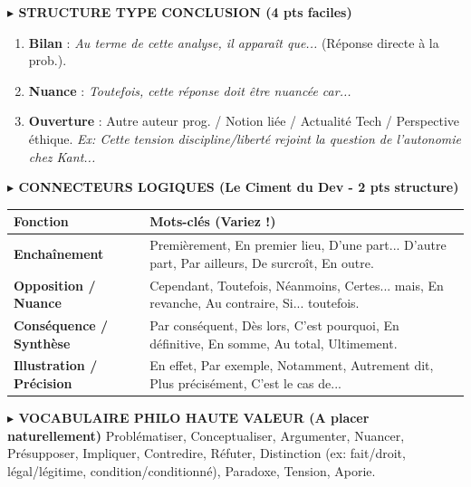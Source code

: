 \documentclass[11pt]{article}
\newcommand{\cle}[1]{{\popxbold\color{popdark}#1}}
\begin{document}
\begin{exemplebox}
\textbf{$\blacktriangleright$ STRUCTURE TYPE CONCLUSION (4 pts faciles)}
\begin{enumerate}
    \item \textbf{Bilan} : \textit{\og{}Au terme de cette analyse, il appara\^it que...\fg{}} (R\'eponse directe \`a la prob.).
    \item \textbf{Nuance} : \textit{\og{}Toutefois, cette r\'eponse doit \^etre nuanc\'ee car...\fg{}}
    \item \textbf{Ouverture} : Autre auteur prog. / Notion li\'ee / Actualit\'e Tech / Perspective \'ethique. \textit{Ex: \og{}Cette tension discipline/libert\'e rejoint la question de l'autonomie chez Kant...\fg{}}
\end{enumerate}
\end{exemplebox}

\begin{exemplebox}
\textbf{$\blacktriangleright$ CONNECTEURS LOGIQUES (Le \og{}Ciment\fg{} du Dev - 2 pts structure)}
\begin{center}
\begin{tabular}{|l|l|}\hline
\textbf{Fonction} & \textbf{Mots-cl\'es (Variez !)} \\ \hline
\textbf{Encha\^inement} & Premièrement, En premier lieu, D'une part... D'autre part, Par ailleurs, De surcro\^it, En outre. \\ \hline
\textbf{Opposition / Nuance} & Cependant, Toutefois, N\'eanmoins, Certes... mais, En revanche, Au contraire, Si... toutefois. \\ \hline
\textbf{Cons\'equence / Synth\`ese} & Par cons\'equent, D\`es lors, C'est pourquoi, En d\'efinitive, En somme, Au total, Ultimement. \\ \hline
\textbf{Illustration / Pr\'ecision} & En effet, Par exemple, Notamment, Autrement dit, Plus pr\'ecis\'ement, C'est le cas de... \\ \hline
\end{tabular}
\end{center}

\textbf{$\blacktriangleright$ VOCABULAIRE PHILO \og{}HAUTE VALEUR\fg{} (A placer naturellement)}
\cle{Probl\'ematiser}, \cle{Conceptualiser}, \cle{Argumenter}, \cle{Nuancer}, \cle{Pr\'esupposer}, \cle{Impliquer}, \cle{Contredire}, \cle{R\'efuter}, \cle{Distinction} (ex: fait/droit, l\'egal/l\'egitime, condition/conditionn\'e), \cle{Paradoxe}, \cle{Tension}, \cle{Aporie}.


\end{exemplebox}
\end{document}
